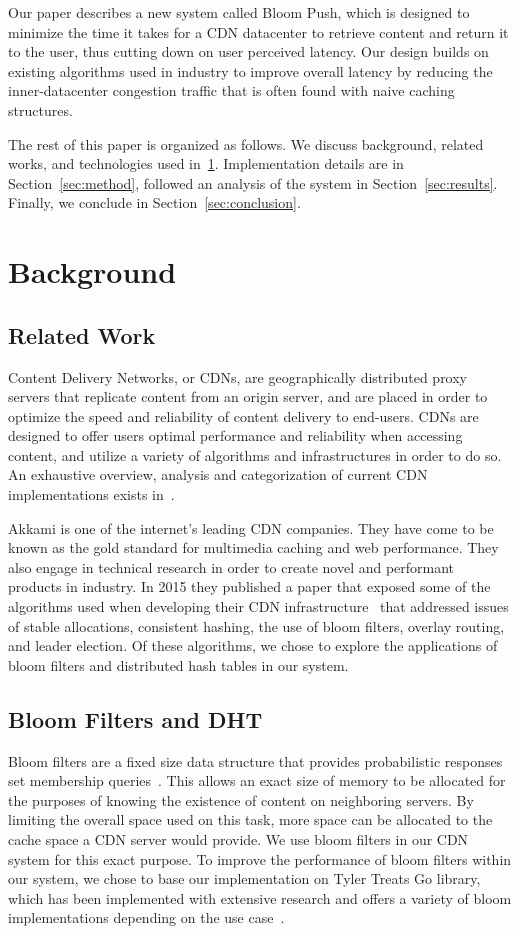 \documentclass[conference]{IEEEtran}
\begin{document}
Our paper describes a new system called Bloom Push, which is designed to minimize the time it takes for a CDN datacenter to retrieve content and return it to the user, thus cutting down on user perceived latency.  Our design builds on existing algorithms used in industry to improve overall latency by reducing the inner-datacenter congestion traffic that is often found with naive caching structures.

The rest of this paper is organized as follows.  We discuss background, related works, and technologies used in~\ref{sec:back}.  Implementation details are in Section~\ref{sec:method}, followed an analysis of the system in Section~\ref{sec:results}.  Finally, we conclude in Section~\ref{sec:conclusion}. 

\section{Background}\label{sec:back}
\subsection*{Related Work}
Content Delivery Networks, or CDNs, are geographically distributed proxy servers that replicate content from an origin server, and are placed in order to optimize the speed and reliability of content delivery to end-users. CDNs are designed to offer users optimal performance and reliability when accessing content, and utilize a variety of algorithms and infrastructures in order to do so. An exhaustive overview, analysis and categorization of current CDN implementations exists in~\cite{PathanTaxonomy}. 

Akkami is one of the internet's leading CDN companies.  They have come to be known as the gold standard for multimedia caching and web performance. They also engage in technical research in order to create novel and performant products in industry. In 2015 they published a paper that exposed some of the algorithms used when developing their CDN infrastructure~\cite{MaggsNuggets} that addressed issues of stable allocations, consistent hashing, the use of bloom filters, overlay routing, and leader election.  Of these algorithms, we chose to explore the applications of bloom filters and distributed hash tables in our system.

\subsection*{Bloom Filters and DHT}
Bloom filters are a fixed size data structure that provides probabilistic responses set membership queries~\cite{BroderBloom}.  This allows an exact size of memory to be allocated for the purposes of knowing the existence of content on neighboring servers.  By limiting the overall space used on this task, more space can be allocated to the cache space a CDN server would provide.  We use bloom filters in our CDN system for this exact purpose.  To improve the performance of bloom filters within our system, we chose to base our implementation on Tyler Treats Go library, which has been implemented with extensive research and offers a variety of bloom implementations depending on the use case~\cite{TreatBloom}.
\end{document}
